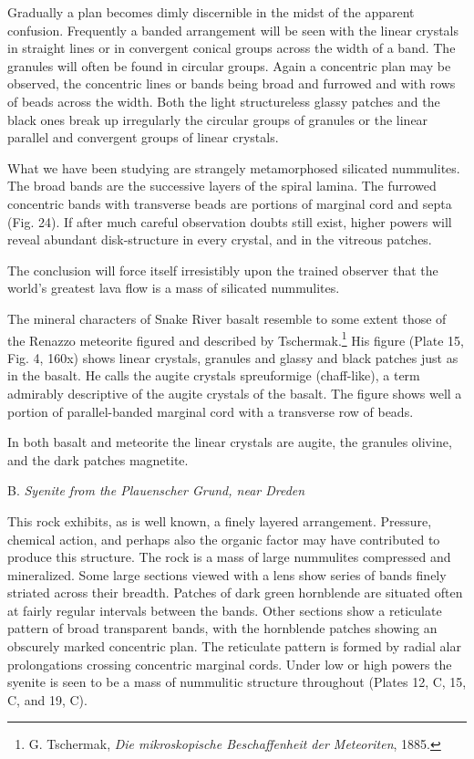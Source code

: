 \documentclass[a4paper, 12pt, oneside]{article}
\begin{document}
Gradually a plan becomes dimly discernible in the midst of the apparent confusion. Frequently a banded arrangement will be seen with the linear crystals in straight lines or in convergent conical groups across the width of a band. The granules will often be found in circular groups. Again a concentric plan may be observed, the concentric lines or bands being broad and furrowed and with rows of beads across the width. Both the light structureless glassy patches and the black ones break up irregularly the circular groups of granules or the linear parallel and convergent groups of linear crystals.

What we have been studying are strangely metamorphosed silicated nummulites. The broad bands are the successive layers of the spiral lamina. The furrowed concentric bands with transverse beads are portions of marginal cord and septa (Fig. 24). If after much careful observation doubts still exist, higher powers will reveal abundant disk-structure in every crystal, and in the vitreous patches.

The conclusion will force itself irresistibly upon the trained observer that the world's greatest lava flow is a mass of silicated nummulites.

The mineral characters of Snake River basalt resemble to some extent those of the Renazzo meteorite figured and described by Tschermak.\footnote{G. Tschermak, \emph{Die mikroskopische Beschaffenheit der Meteoriten}, 1885.} His figure (Plate 15, Fig. 4, 160x) shows linear crystals, granules and glassy and black patches just as in the basalt. He calls the augite crystals spreuformige (chaff-like), a term admirably descriptive of the augite crystals of the basalt. The figure shows well a portion of parallel-banded marginal cord with a transverse row of beads.

In both basalt and meteorite the linear crystals are augite, the granules olivine, and the dark patches magnetite.

\bigskip
\centerline{B. \emph{Syenite from the Plauenscher Grund, near Dreden}}

This rock exhibits, as is well known, a finely layered arrangement. Pressure, chemical action, and perhaps also the organic factor may have contributed to produce this structure. The rock is a mass of large nummulites compressed and mineralized. Some large sections viewed with a lens show series of bands finely striated across their breadth. Patches of dark green hornblende are situated often at fairly regular intervals between the bands. Other sections show a reticulate pattern of broad transparent bands, with the hornblende patches showing an obscurely marked concentric plan. The reticulate pattern is formed by radial alar prolongations crossing concentric marginal cords. Under low or high powers the syenite is seen to be a mass of nummulitic structure throughout (Plates 12, C, 15, C, and 19, C).
\end{document}
